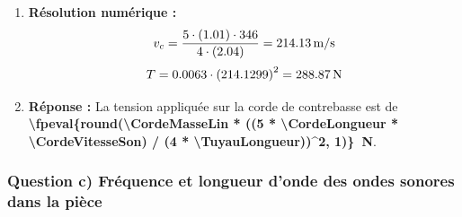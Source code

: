 \begin{enumerate}[label=\arabic*)]
    \item \textbf{Résolution numérique :}
    \[
    v_c = \frac{5 \cdot (\fpeval{\CordeLongueur/100}) \cdot \CordeVitesseSon}{4 \cdot (\fpeval{\TuyauLongueur/100})} = \qty{\fpeval{round((5 * \CordeLongueur * \CordeVitesseSon) / (4 * \TuyauLongueur), 2)}}{m/s}
    \]
    \[
    T = \CordeMasseLin \cdot \left( \fpeval{round((5 * \CordeLongueur * \CordeVitesseSon) / (4 * \TuyauLongueur), 4)} \right)^2 = \qty{\fpeval{round(\CordeMasseLin * ((5 * \CordeLongueur * \CordeVitesseSon) / (4 * \TuyauLongueur))^2, 2)}}{N}
    \]

    \item \textbf{Réponse :}
    La tension appliquée sur la corde de contrebasse est de \textbf{\qty{\fpeval{round(\CordeMasseLin * ((5 * \CordeLongueur * \CordeVitesseSon) / (4 * \TuyauLongueur))^2, 1)}}{N}}.
\end{enumerate}


\subsubsection*{Question c) Fréquence et longueur d'onde des ondes sonores dans la pièce}

